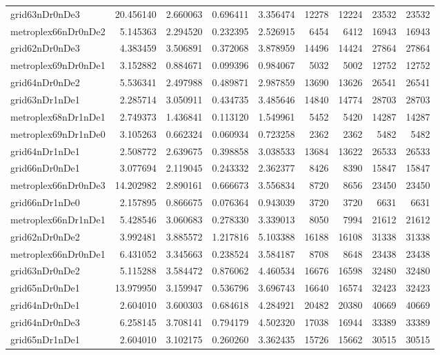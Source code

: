 \begin{longtable}{|l|r|r|r|r|r|r|r|r|}
grid63nDr0nDe3 & 20.456140 & 2.660063 & 0.696411 & 3.356474 & 12278 & 12224 & 23532 & 23532 \\
metroplex66nDr0nDe2 & 5.145363 & 2.294520 & 0.232395 & 2.526915 & 6454 & 6412 & 16943 & 16943 \\
grid62nDr0nDe3 & 4.383459 & 3.506891 & 0.372068 & 3.878959 & 14496 & 14424 & 27864 & 27864 \\
metroplex69nDr0nDe1 & 3.152882 & 0.884671 & 0.099396 & 0.984067 & 5032 & 5002 & 12752 & 12752 \\
grid64nDr0nDe2 & 5.536341 & 2.497988 & 0.489871 & 2.987859 & 13690 & 13626 & 26541 & 26541 \\
grid63nDr1nDe1 & 2.285714 & 3.050911 & 0.434735 & 3.485646 & 14840 & 14774 & 28703 & 28703 \\
metroplex68nDr1nDe1 & 2.749373 & 1.436841 & 0.113120 & 1.549961 & 5452 & 5420 & 14287 & 14287 \\
metroplex69nDr1nDe0 & 3.105263 & 0.662324 & 0.060934 & 0.723258 & 2362 & 2362 & 5482 & 5482 \\
grid64nDr1nDe1 & 2.508772 & 2.639675 & 0.398858 & 3.038533 & 13684 & 13622 & 26533 & 26533 \\
grid66nDr0nDe1 & 3.077694 & 2.119045 & 0.243332 & 2.362377 & 8426 & 8390 & 15847 & 15847 \\
metroplex66nDr0nDe3 & 14.202982 & 2.890161 & 0.666673 & 3.556834 & 8720 & 8656 & 23450 & 23450 \\
grid66nDr1nDe0 & 2.157895 & 0.866675 & 0.076364 & 0.943039 & 3720 & 3720 & 6631 & 6631 \\
metroplex66nDr1nDe1 & 5.428546 & 3.060683 & 0.278330 & 3.339013 & 8050 & 7994 & 21612 & 21612 \\
grid62nDr0nDe2 & 3.992481 & 3.885572 & 1.217816 & 5.103388 & 16188 & 16108 & 31338 & 31338 \\
metroplex66nDr0nDe1 & 6.431052 & 3.345663 & 0.238524 & 3.584187 & 8708 & 8648 & 23438 & 23438 \\
grid63nDr0nDe2 & 5.115288 & 3.584472 & 0.876062 & 4.460534 & 16676 & 16598 & 32480 & 32480 \\
grid65nDr0nDe1 & 13.979950 & 3.159947 & 0.536796 & 3.696743 & 16640 & 16574 & 32423 & 32423 \\
grid64nDr0nDe1 & 2.604010 & 3.600303 & 0.684618 & 4.284921 & 20482 & 20380 & 40669 & 40669 \\
grid64nDr0nDe3 & 6.258145 & 3.708141 & 0.794179 & 4.502320 & 17038 & 16944 & 33389 & 33389 \\
grid65nDr1nDe1 & 2.604010 & 3.102175 & 0.260260 & 3.362435 & 15726 & 15662 & 30515 & 30515 \\

\end{longtable}
